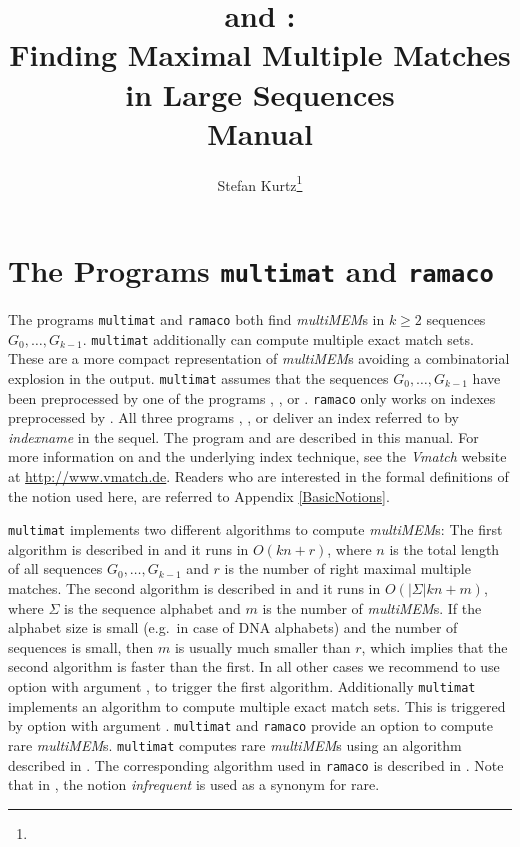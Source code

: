 \documentclass[12pt]{article}
\author{Stefan Kurtz\thanks{\SKaffiliation}}
\title{\MM and \SEMM:\\
       \textbf{Finding Maximal Multiple Matches}\\
       \textbf{in Large Sequences}\\[2mm]
       \textbf{Manual}}
\newcommand{\Size}[1]{|#1|}
\newcommand{\MM}{\texttt{multimat}\xspace}
\newcommand{\SEMM}{\texttt{ramaco}\xspace}
\newcommand{\MMEM}[0]{\textit{multiMEM}\xspace}
\begin{document}
\maketitle

\section{The Programs \MM and \SEMM}
The programs \MM and \SEMM both find \MMEM{s} in \(k\geq 2\) sequences 
\(G_{0},\ldots,G_{k-1}\). \MM additionally can compute multiple exact match 
sets. These are a more compact representation of \MMEM{s} avoiding a
combinatorial explosion in the output. \MM assumes that 
the sequences \(G_{0},\ldots,G_{k-1}\) have been preprocessed by one 
of the programs \MKV, \MKRC, or \MKDNASIX. \SEMM only works on indexes
preprocessed by \MKV. All three programs \MKV, \MKRC, or \MKDNASIX
deliver an index referred to by \emph{indexname} in the sequel.
The program \MKRC and \MKDNASIX are described in this manual.
For more information on \MKV and the underlying index technique, see the
\emph{Vmatch} website at \url{http://www.vmatch.de}.
Readers who are interested in the formal definitions of 
the notion used here, are referred to Appendix \ref{BasicNotions}.

\MM implements two different algorithms to compute \MMEM{s}:
The first algorithm is described in \cite{HOEH:KUR:OHL:2002}
and it runs in \(O(kn+r)\), where \(n\) is the total length of
all sequences \(G_{0},\ldots,G_{k-1}\) and \(r\) is the number
of right maximal multiple matches.
The second algorithm is described in \cite{KUR:LON:2004}
and it runs in \(O(\Size{\Sigma}kn+m)\), where \(\Sigma\) is the
sequence alphabet and \(m\) is the number of \MMEM{s}.
If the alphabet size is small (e.g.\ in case of DNA alphabets)
and the number of sequences is small, then \(m\) is usually much
smaller than \(r\), which implies that the second algorithm is faster
than the first. In all other cases we recommend to use option
 with argument ,
to trigger the first algorithm.
Additionally \MM implements an algorithm to compute multiple exact
match sets. This is triggered by option 
 with argument .
\MM and \SEMM provide an option  to compute
rare \MMEM{s}. \MM computes rare \MMEM{s} using an 
algorithm described in \cite{ABO:KUR:OHL:2006}. The corresponding algorithm
used in \SEMM is described in \cite{OHL:KUR:2007}. Note that in
\cite{ABO:KUR:OHL:2006}, the notion \textit{infrequent} is used as a synonym 
for rare.
\end{document}
